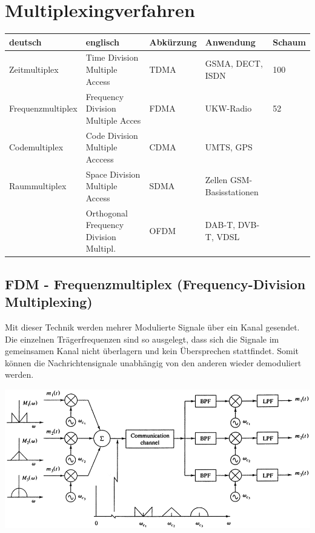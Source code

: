 \section{Multiplexingverfahren} \label{multiplex}
	\begin{tabular}{|l|l|l|l|l|}
	\hline
		\textbf{deutsch} & \textbf{englisch} &
		\textbf{Abkürzung} & \textbf{Anwendung} &
		\textbf{Schaum} \\
	\hline
		Zeitmultiplex & Time Division Multiple Access & TDMA & GSMA, DECT, ISDN & 100 \\
	\hline
		Frequenzmultiplex & Frequency Division Multiple Acces & FDMA & UKW-Radio & 52 \\
	\hline
		Codemultiplex & Code Division Multiple Acccess & CDMA & UMTS, GPS & \\
	\hline
		Raummultiplex & Space Division Multiple Access & SDMA & Zellen GSM-Basisstationen & \\
	\hline
		& Orthogonal Frequency Division Multipl. &
		OFDM & DAB-T, DVB-T, VDSL &\\ 
	\hline
\end{tabular}

\subsection{FDM - Frequenzmultiplex (Frequency-Division Multiplexing) }
Mit dieser Technik werden mehrer Modulierte Signale über ein Kanal gesendet. Die einzelnen
Trägerfrequenzen sind so ausgelegt, dass sich die Signale im gemeinsamen Kanal nicht überlagern und
kein Übersprechen stattfindet. Somit können die Nachrichtensignale unabhängig von den anderen
wieder demoduliert werden.
\begin{center}
    \includegraphics[width=14cm]{bilder/multiplex_fdm_blockdiagramm.png}
\end{center}

